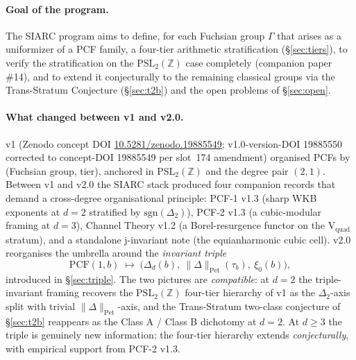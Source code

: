 \documentclass[11pt,a4paper]{article}
\theoremstyle{definition}
\theoremstyle{remark}
\newcommand{\PSLZ}{\mathrm{PSL}_2(\mathbb{Z})}
\newcommand{\PCF}{\mathrm{PCF}}
\newcommand{\PetN}[1]{\lVert #1 \rVert_{\mathrm{Pet}}}
\begin{document}
\paragraph{Goal of the program.}
The SIARC program aims to define, for each Fuchsian group $\Gamma$ that
arises as a uniformizer of a PCF family, a four-tier arithmetic
stratification (\S\ref{sec:tiers}), to verify the stratification on the
$\PSLZ$ case completely (companion paper \#14), and to extend it
conjecturally to the remaining classical groups via the Trans-Stratum
Conjecture (\S\ref{sec:t2b}) and the open problems of \S\ref{sec:open}.

\paragraph{What changed between v1 and v2.0.}
\label{par:v1-to-v2}
v1 (Zenodo concept DOI \href{https://doi.org/10.5281/zenodo.19885549}{10.5281/zenodo.19885549};
v1.0-version-DOI 19885550 corrected to concept-DOI 19885549 per slot~174 amendment)
organised PCFs by (Fuchsian group, tier), anchored in $\PSLZ$ and the
degree pair $(2,1)$. Between v1 and v2.0 the SIARC stack produced four
companion records that demand a cross-degree organisational principle:
PCF-1 v1.3 (sharp WKB exponents at $d=2$ stratified by $\mathrm{sgn}(\Delta_2)$),
PCF-2 v1.3 (a cubic-modular framing at $d=3$),
Channel Theory v1.2 (a Borel-resurgence functor on the V$_{\mathrm{quad}}$
stratum), and a standalone j-invariant note (the equianharmonic cubic
cell). v2.0 reorganises the umbrella around the \emph{invariant triple}
\begin{equation}
  \label{eq:invariant-triple}
  \PCF(1,b) \;\longmapsto\; \bigl(\Delta_d(b),\ \PetN{\Delta}(\tau_b),\ \xi_0(b)\bigr),
\end{equation}
introduced in \S\ref{sec:triple}. The two pictures are
\emph{compatible}: at $d=2$ the triple-invariant framing recovers the
$\PSLZ$ four-tier hierarchy of v1 as the $\Delta_2$-axis split with
trivial $\PetN{\Delta}$-axis, and the Trans-Stratum two-class
conjecture of \S\ref{sec:t2b} reappears as the Class A / Class B
dichotomy at $d=2$. At $d \geq 3$ the triple is genuinely new
information; the four-tier hierarchy extends \emph{conjecturally},
with empirical support from PCF-2 v1.3.
\end{document}
